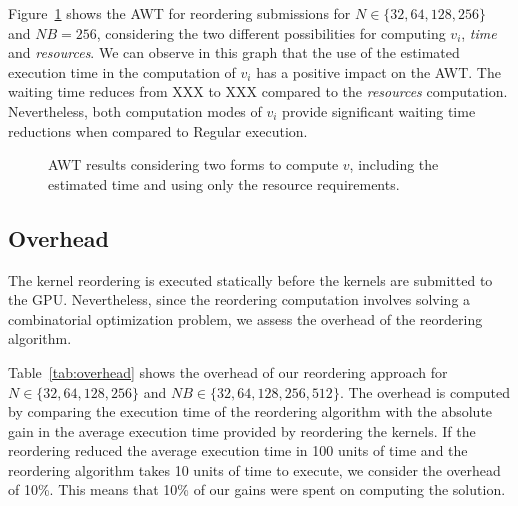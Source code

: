 \documentclass[conference]{IEEEtran}
\begin{document}
Figure~\ref{fig:awt} shows the AWT for reordering submissions for $N \in \{32,64,128,256\}$ and $NB = 256$, considering the two different possibilities for computing $v_i$, \textit{time} and \textit{resources}. We can observe in this graph that the use of the estimated execution time in the computation of $v_i$ has a  positive impact on the AWT. The waiting time reduces from XXX to XXX compared to the \textit{resources} computation. Nevertheless, both computation modes of $v_i$ provide significant waiting time reductions when compared to Regular execution.  

\begin{figure}[htb]
\begin{center}
\end{center}
\caption{AWT results considering two forms to compute $v$, including the estimated time and using only the resource requirements.}
\label{fig:awt}
\end{figure}


\subsection{Overhead}

The kernel reordering is executed statically before the kernels are submitted to the GPU. Nevertheless, since the reordering computation involves solving a combinatorial optimization problem, we assess the overhead of the reordering algorithm.

Table~\ref{tab:overhead} shows the overhead of our reordering approach for $N \in \{32,64,128,256\}$ and $NB \in \{32,64,128,256,512\}$. The overhead is computed by comparing the execution time of the reordering algorithm with the absolute gain in the average execution time provided by reordering the kernels. If the reordering reduced the average execution time in 100 units of time and the reordering algorithm takes 10 units of time to execute, we consider the overhead of 10\%. This means that 10\% of our gains were spent on computing the solution.
\end{document}
